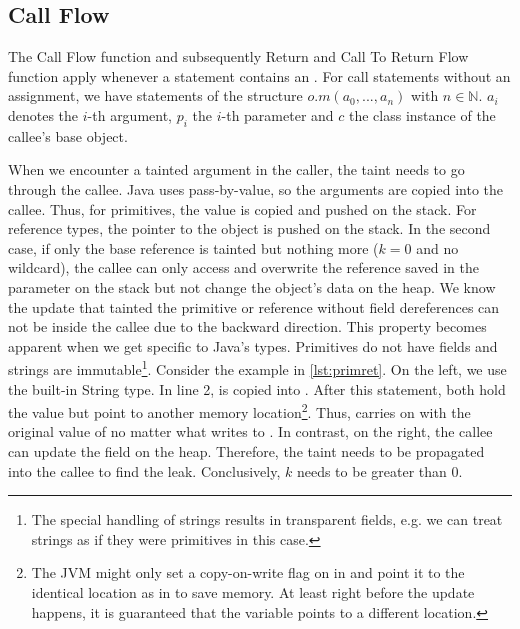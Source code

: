 \documentclass[../draft.tex]{subfiles}
\begin{document}
    \subsection{Call Flow}
    The Call Flow function and subsequently Return and Call To Return Flow function apply whenever a statement contains an .
    For call statements without an assignment, we have statements of the structure $o.m(a_0, ..., a_n)$ with $n \in \mathbb{N}$. $a_i$ denotes the $i$-th argument, $p_i$ the $i$-th parameter and $c$ the class instance of the callee's base object.

    When we encounter a tainted argument in the caller, the taint needs to go through the callee. Java uses pass-by-value, so the arguments are copied into the callee. Thus, for primitives, the value is copied and pushed on the stack. For reference types, the pointer to the object is pushed on the stack. In the second case, if only the base reference is tainted but nothing more ($k=0$ and no wildcard), the callee can only access and overwrite the reference saved in the parameter on the stack but not change the object's data on the heap. 
    We know the update that tainted the primitive or reference without field dereferences can not be inside the callee due to the backward direction. 
    This property becomes apparent when we get specific to Java's types. Primitives do not have fields and strings are immutable\footnote{The special handling of strings results in transparent fields, e.g. we can treat strings as if they were primitives in this case.}. Consider the example in \autoref{lst:primret}. On the left, we use the built-in String type. In line 2,  is copied into . After this statement, both  hold the value  but point to another memory location\footnote{The JVM might only set a copy-on-write flag on  in  and point it to the identical location as  in  to save memory. At least right before the update happens, it is guaranteed that the variable points to a different location.}. Thus,  carries on with the original value of  no matter what  writes to . In contrast, on the right, the callee can update the field on the heap. Therefore, the taint needs to be propagated into the callee to find the leak. Conclusively, $k$ needs to be greater than $0$.
\end{document}
